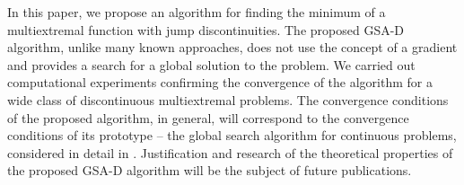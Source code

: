 \documentclass[runningheads]{llncs}
\begin{document}
In this paper, we propose an algorithm for finding the minimum of a multiextremal function with jump discontinuities. The proposed GSA-D algorithm, unlike many known approaches, does not use the concept of a gradient and provides a search for a global solution to the problem. We carried out computational experiments confirming the convergence of the algorithm for a wide class of discontinuous multiextremal problems. The convergence conditions of the proposed algorithm, in general, will correspond to the convergence conditions of its prototype -- the global search algorithm for continuous problems, considered in detail in \cite{Strongin2000}. Justification and research of the theoretical properties of the proposed GSA-D algorithm will be the subject of future publications.


%
%
%
 
 
\end{document}

